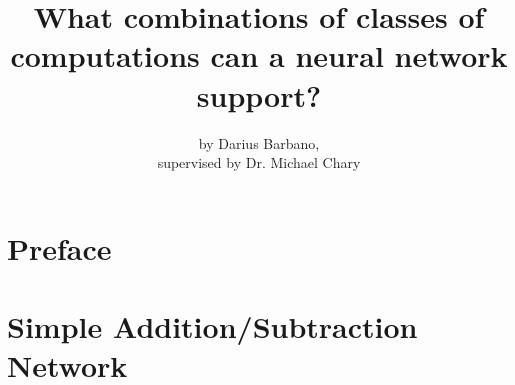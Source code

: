 \documentclass[12pt]{article}
\begin{document}
\title{What combinations of classes of computations can a neural network support?}
\author{by Darius Barbano, \\ supervised by Dr. Michael Chary}
\maketitle

\newpage
\section{Preface}


\newpage
\section{Simple Addition/Subtraction Network}

\end{document}
